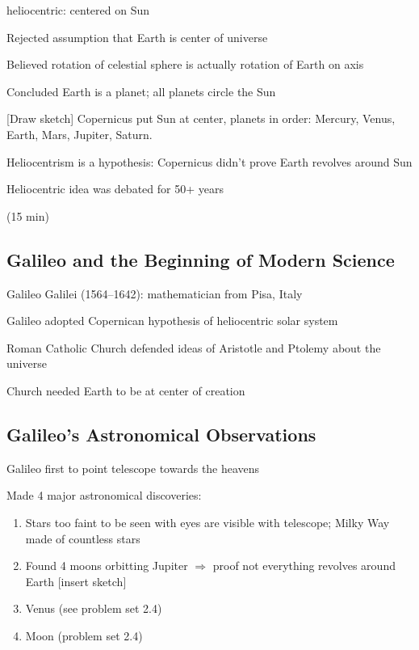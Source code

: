 \documentclass[main.tex]{subfiles}
\begin{document}
\gls{heliocentric}: centered on Sun

Rejected assumption that Earth is center of universe

Believed rotation of celestial sphere is actually rotation of Earth on axis


Concluded Earth is a planet; all planets circle the Sun

[Draw sketch] Copernicus put Sun at center, planets in order: Mercury, Venus, Earth, Mars, Jupiter, Saturn.

Heliocentrism is a hypothesis: Copernicus didn't prove Earth revolves around Sun

Heliocentric idea was debated for 50+ years

{\color{lightgray} \footnotesize (15 min)}
\vspace{-1ex}

\hgraydashline

\subsection*{Galileo and the Beginning of Modern Science}

Galileo Galilei (1564–1642): mathematician from Pisa, Italy

Galileo adopted Copernican hypothesis of  heliocentric solar system

Roman Catholic Church defended ideas of Aristotle and Ptolemy about the universe

Church needed Earth to be at center of creation

\subsection*{Galileo's Astronomical Observations}

Galileo first to point telescope towards the heavens

Made 4 major astronomical discoveries:
\vspace{-1em}

\begin{enumerate}
\setlength\itemsep{0.1ex}
    \item Stars too faint to be seen with eyes are visible with telescope; Milky Way made of countless stars
    \item Found 4 moons orbitting Jupiter $\Rightarrow$ proof not everything revolves around Earth [insert sketch]
    \item Venus (see problem set 2.4)
    \item Moon (problem set 2.4)

\end{enumerate}
\end{document}
